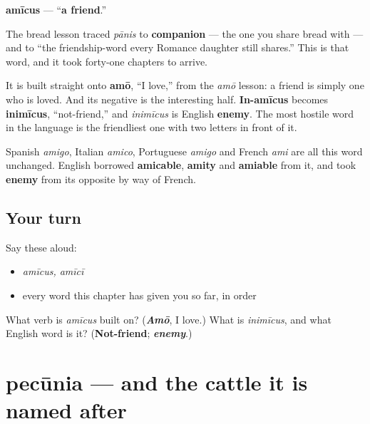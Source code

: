 \begin{cousinweb}
\textbf{amīcus} — \textquotedblleft{}\textbf{a friend}.\textquotedblright{}

The bread lesson traced \emph{pānis} to \textbf{companion} — the one you share bread with — and to \textquotedblleft{}the friendship-word every Romance daughter still shares.\textquotedblright{} This is that word, and it took forty-one chapters to arrive.

It is built straight onto \textbf{amō}, \textquotedblleft{}I love,\textquotedblright{} from the \emph{amō} lesson: a friend is simply one who is loved. And its negative is the interesting half. \textbf{In-amīcus} becomes \textbf{inimīcus}, \textquotedblleft{}not-friend,\textquotedblright{} and \emph{inimīcus} is English \textbf{enemy}. The most hostile word in the language is the friendliest one with two letters in front of it.

Spanish \emph{amigo}, Italian \emph{amico}, Portuguese \emph{amigo} and French \emph{ami} are all this word unchanged. English borrowed \textbf{amicable}, \textbf{amity} and \textbf{amiable} from it, and took \textbf{enemy} from its opposite by way of French.
\end{cousinweb}

\subsection*{Your turn}
Say these aloud:

\begin{itemize}
\raggedright
  \item \emph{amīcus, amīcī}
  \item every word this chapter has given you so far, in order
\end{itemize}

\begin{tcolorbox}[breakable,colback=teal!4,colframe=teal!35!black,title={Before you move on}]
What verb is \emph{amīcus} built on? (\emph{\textbf{Amō}}, I love.) What is \emph{inimīcus}, and what English word is it? (\textbf{Not-friend}; \emph{\textbf{enemy}}.)
\end{tcolorbox}
\section[pecūnia, pecūniae]{pecūnia — and the cattle it is named after}

\label{lesson:LA-C51-pecunia}



